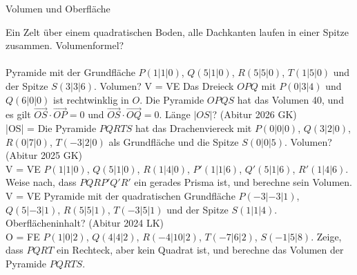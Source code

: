 \setcounter{aufgabe}{14}

\begin{aufgabe}{Volumen und Oberfläche}
\begin{teile}
\teil Ein Zelt über einem quadratischen Boden, alle Dachkanten laufen in einer Spitze zusammen. Volumenformel? \\  \\ 
\teil Pyramide mit der Grundfläche $P(1 | 1 | 0)$, $Q(5 | 1 | 0)$, $R(5 | 5 | 0)$, $T(1 | 5 | 0)$ und der Spitze $S(3 | 3 | 6)$. Volumen? V = \leerfeld VE
\teil Das Dreieck $OPQ$ mit $P(0 | 3 | 4)$ und $Q(6 | 0 | 0)$ ist rechtwinklig in $O$. Die Pyramide $OPQS$ hat das Volumen 40, und es gilt $\overrightarrow{OS} \cdot \overrightarrow{OP} = 0$ und $\overrightarrow{OS} \cdot \overrightarrow{OQ} = 0$. Länge $|OS|$? \hfill (Abitur 2026 GK) \\ |OS| = \leerfeld
\teil Die Pyramide $PQRTS$ hat das Drachenviereck mit $P(0 | 0 | 0)$, $Q(3 | 2 | 0)$, $R(0 | 7 | 0)$, $T(-3 | 2 | 0)$ als Grundfläche und die Spitze $S(0 | 0 | 5)$. Volumen? \hfill (Abitur 2025 GK) \\ V = \leerfeld VE
\teil $P(1 | 1 | 0)$, $Q(5 | 1 | 0)$, $R(1 | 4 | 0)$, $P'(1 | 1 | 6)$, $Q'(5 | 1 | 6)$, $R'(1 | 4 | 6)$. Weise nach, dass $PQRP'Q'R'$ ein gerades Prisma ist, und berechne sein Volumen. V = \leerfeld VE
\teil Pyramide mit der quadratischen Grundfläche $P(-3 | -3 | 1)$, $Q(5 | -3 | 1)$, $R(5 | 5 | 1)$, $T(-3 | 5 | 1)$ und der Spitze $S(1 | 1 | 4)$. Oberflächeninhalt? \hfill (Abitur 2024 LK) \\ O = \leerfeld FE
\teil $P(1 | 0 | 2)$, $Q(4 | 4 | 2)$, $R(-4 | 10 | 2)$, $T(-7 | 6 | 2)$, $S(-1 | 5 | 8)$. Zeige, dass $PQRT$ ein Rechteck, aber kein Quadrat ist, und berechne das Volumen der Pyramide $PQRTS$.
\end{teile}
\end{aufgabe}

